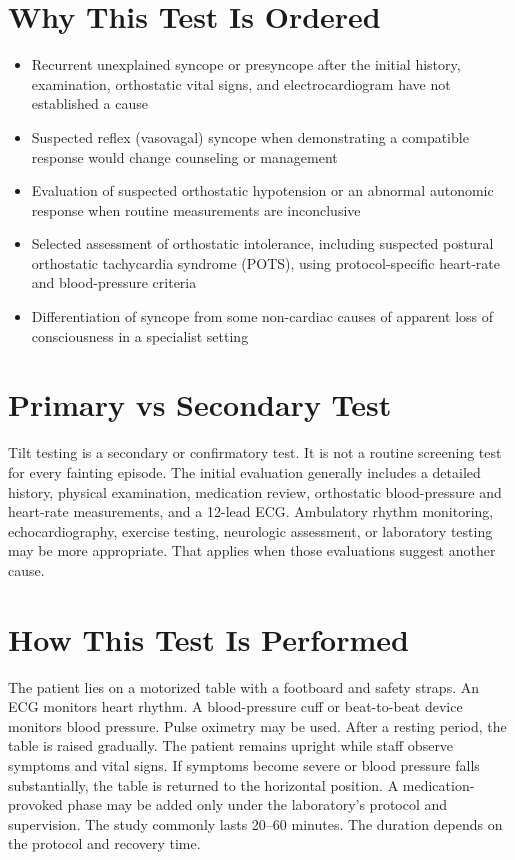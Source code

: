 \section*{Why This Test Is Ordered}
\begin{itemize}
  \item Recurrent unexplained syncope or presyncope after the initial history, examination, orthostatic vital signs, and electrocardiogram have not established a cause
  \item Suspected reflex (vasovagal) syncope when demonstrating a compatible response would change counseling or management
  \item Evaluation of suspected orthostatic hypotension or an abnormal autonomic response when routine measurements are inconclusive
  \item Selected assessment of orthostatic intolerance, including suspected postural orthostatic tachycardia syndrome (POTS), using protocol-specific heart-rate and blood-pressure criteria
  \item Differentiation of syncope from some non-cardiac causes of apparent loss of consciousness in a specialist setting
\end{itemize}

\section*{Primary vs Secondary Test}
Tilt testing is a secondary or confirmatory test. It is not a routine screening test for every fainting episode. The initial evaluation generally includes a detailed history, physical examination, medication review, orthostatic blood-pressure and heart-rate measurements, and a 12-lead ECG. Ambulatory rhythm monitoring, echocardiography, exercise testing, neurologic assessment, or laboratory testing may be more appropriate. That applies when those evaluations suggest another cause.

\section*{How This Test Is Performed}
The patient lies on a motorized table with a footboard and safety straps. An ECG monitors heart rhythm. A blood-pressure cuff or beat-to-beat device monitors blood pressure. Pulse oximetry may be used. After a resting period, the table is raised gradually. The patient remains upright while staff observe symptoms and vital signs. If symptoms become severe or blood pressure falls substantially, the table is returned to the horizontal position. A medication-provoked phase may be added only under the laboratory's protocol and supervision. The study commonly lasts 20--60 minutes. The duration depends on the protocol and recovery time.

